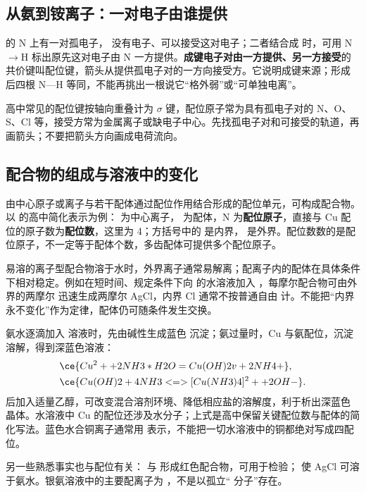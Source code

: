 \documentclass[UTF8,a4paper,zihao=5,oneside,openany,fontset=none]{ctexbook}
\def\sigma{σ}\def\pi{π}\def\Delta{Δ}\def\alpha{α}\def\beta{β}%
\begin{document}
\subsection{从氨到铵离子：一对电子由谁提供}
 的 N 上有一对孤电子， 没有电子、可以接受这对电子；二者结合成  时，可用 N$\to$H 标出原先这对电子由 N 一方提供。\textbf{成键电子对由一方提供、另一方接受}的共价键叫配位键，箭头从提供孤电子对的一方向接受方。它说明成键来源；形成  后四根 N—H 等同，不能再挑出一根说它“格外弱”或“可单独电离”。

高中常见的配位键按轴向重叠计为 $\sigma$ 键，配位原子常为具有孤电子对的 N、O、S、Cl 等，接受方常为金属离子或缺电子中心。先找孤电子对和可接受的轨道，再画箭头；不要把箭头方向画成电荷流向。

\subsection{配合物的组成与溶液中的变化}
由中心原子或离子与若干配体通过配位作用结合形成的配位单元，可构成配合物。以  的高中简化表示为例： 为中心离子， 为配体，N 为\textbf{配位原子}，直接与 Cu 配位的原子数为\textbf{配位数}，这里为 4；方括号中的  是内界， 是外界。配位数数的是配位原子，不一定等于配体个数，多齿配体可提供多个配位原子。

易溶的离子型配合物溶于水时，外界离子通常易解离；配离子内的配体在具体条件下相对稳定。例如在短时间、规定条件下向  的水溶液加入 ，每摩尔配合物可由外界的两摩尔  迅速生成两摩尔 AgCl，内界 Cl 通常不按普通自由  计。不能把“内界永不变化”作为定律，配体仍可随条件发生交换。

氨水逐滴加入  溶液时，先由碱性生成蓝色  沉淀；氨过量时，Cu 与氨配位，沉淀溶解，得到深蓝色溶液：
\begin{align*}
&\ce{Cu^2+ + 2NH3*H2O = Cu(OH)2 v + 2NH4+},\\
&\ce{Cu(OH)2 + 4NH3 <=> [Cu(NH3)4]^2+ + 2OH-}.
\end{align*}
后加入适量乙醇，可改变混合溶剂环境、降低相应盐的溶解度，利于析出深蓝色  晶体。水溶液中 Cu 的配位还涉及水分子；上式是高中保留关键配位数与配体的简化写法。蓝色水合铜离子通常用  表示，不能把一切水溶液中的铜都绝对写成四配位。

另一些熟悉事实也与配位有关： 与  形成红色配合物，可用于检验； 使 AgCl 可溶于氨水。银氨溶液中的主要配离子为 \ce{[Ag(NH3)2]+}，不是以孤立“ 分子”存在。
\end{document}
